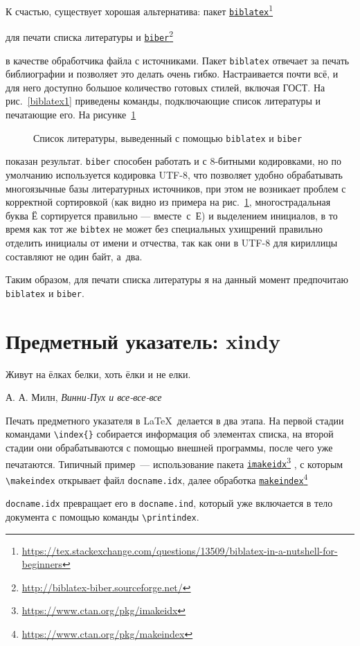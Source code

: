 \documentclass[a4paper,12pt]{article}
\newcommand\foothref[2]{%
  \href{#1}{#2}\footnote{\url{#1}}%
}
\newcommand\package[1]{\texttt{#1}}
\newcommand\exe[1]{\texttt{#1}}
\newcommand\file[1]{\texttt{#1}}
\begin{document}
К счастью, существует хорошая альтернатива: пакет
\foothref{https://tex.stackexchange.com/questions/13509/biblatex-in-a-nutshell-for-beginners}{\package{biblatex}}
для печати списка литературы и
\foothref{http://biblatex-biber.sourceforge.net/}{\exe{biber}}
в качестве обработчика файла с источниками.
Пакет \package{biblatex} отвечает за печать библиографии и позволяет
это делать очень гибко. Настраивается почти всё, и для него доступно большое
количество готовых стилей, включая ГОСТ. На рис.~\ref{biblatex1}
приведены
команды, подключающие список литературы и печатающие его. На рисунке~\ref{biblatex2}%
\nocite{yolkin1997,esin1950,eliseeva2010,chebyshev1859}%
%
%
\begin{figure}[tp]
\begin{tcolorbox}[colback=white]
\centering
\small
\printbibliography
\end{tcolorbox}
\caption{Список литературы, выведенный с помощью \package{biblatex} и \exe{biber}}\label{biblatex2}
\end{figure}
показан результат.
\exe{biber} способен работать и с 8-битными кодировками, но по умолчанию
используется кодировка UTF-8, что позволяет удобно обрабатывать многоязычные
базы литературных источников, при этом не возникает проблем с корректной сортировкой
(как видно из примера на рис.~\ref{biblatex2}, многострадальная буква Ё
сортируется правильно --- вместе~с~Е) и выделением инициалов, в то время как
тот же \exe{bibtex} не может без специальных ухищрений правильно отделить
инициалы от имени и отчества, так как они в UTF-8 для кириллицы составляют не
один байт, а~два.

Таким образом, для печати списка литературы я на данный момент предпочитаю
\package{biblatex} и \exe{biber}.

\section{Предметный указатель: xindy}
\epigraph{Живут на ёлках белки, хоть ёлки и не елки.}{А. А. Милн, \emph{Винни-Пух и все-все-все}}
Печать предметного указателя в \LaTeX\ делается в два этапа. На первой стадии
командами \verb|\index{}| собирается информация об элементах списка,
на второй стадии они обрабатываются с помощью внешней программы, после
чего уже печатаются. Типичный пример~--- использование пакета
\foothref{https://www.ctan.org/pkg/imakeidx}{\package{imakeidx}},
с которым \verb|\makeindex| открывает файл \file{docname.idx}, далее
обработка \foothref{https://www.ctan.org/pkg/makeindex}{\package{makeindex}}
\file{docname.idx} превращает его в \file{docname.ind},
который уже включается в тело документа с помощью команды \verb|\printindex|.
\end{document}
